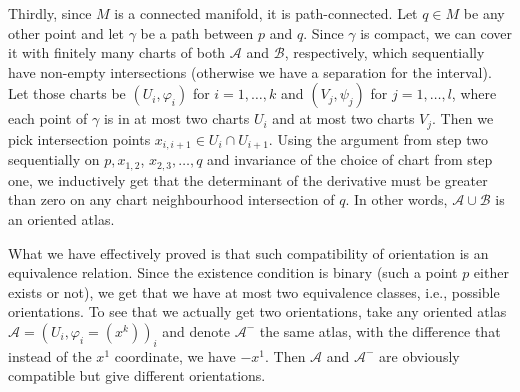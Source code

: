 \documentclass[a4paper, 12pt]{article}
\begin{document}
\begin{Exercise}
\begin{enumerate}[label=(\roman*)]
            Thirdly, since $M$ is a connected manifold, it is path-connected.
            Let $q \in M$ be any other point and let $\gamma$ be a path between $p$ and $q$.
            Since $\gamma$ is compact, we can cover it with finitely many charts of both $\mathcal{A}$ and $\mathcal{B}$, respectively, which sequentially have non-empty intersections (otherwise we have a separation for the interval).
            Let those charts be $(U_i, \varphi_i)$ for $i = 1,\dots, k$ and $(V_j, \psi_j)$ for $j = 1,\dots, l$, where each point of $\gamma$ is in at most two charts $U_i$ and at most two charts $V_j$.
            Then we pick intersection points $x_{i, i+1} \in U_i \cap U_{i+1}$.
            Using the argument from step two sequentially on $p, x_{1, 2}$, $x_{2, 3}, \dots, q$ and invariance of the choice of chart from step one,
            we inductively get that the determinant of the derivative must be greater than zero on any chart neighbourhood intersection of $q$.
            In other words, $\mathcal{A} \cup \mathcal{B}$ is an oriented atlas.

            What we have effectively proved is that such compatibility of orientation is an equivalence relation.
            Since the existence condition is binary (such a point $p$ either exists or not), we get that we have at most two equivalence classes, i.e., possible orientations.
            To see that we actually get two orientations, take any oriented atlas $\mathcal{A} = (U_i, \varphi_i = (x^k))_i$
            and denote $\mathcal{A}^-$ the same atlas, with the difference that instead of the $x^1$ coordinate, we have $-x^1$.
            Then $\mathcal{A}$ and $\mathcal{A}^-$ are obviously compatible but give different orientations.


\end{enumerate}
\end{Exercise}
\end{document}
